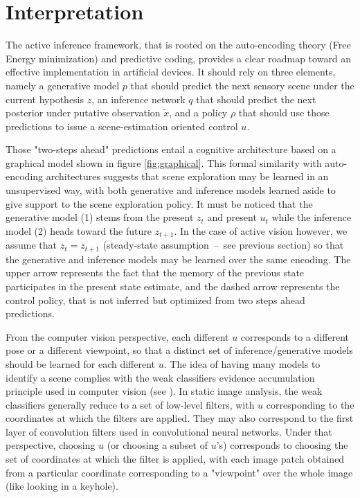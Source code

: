 \documentclass{article} %
\begin{document}
\section{Interpretation}

The active inference framework, that is rooted on the auto-encoding theory (Free Energy minimization) and predictive coding, provides a clear roadmap toward an effective implementation in artificial devices. It should rely on three elements, namely a generative model $p$ that should predict the next sensory scene under the current hypothesis $z$, an inference network $q$ that should predict the next posterior under putative observation $\tilde{x}$, and a policy $\rho$ that should use those predictions to issue a scene-estimation oriented control $u$.  



Those "two-steps ahead" predictions entail a cognitive architecture based on a graphical model shown in figure \ref{fig:graphical}.
This formal similarity with auto-encoding architectures suggests that scene exploration may be learned in an unsupervised way, with both generative and inference models learned aside to give support to the scene exploration policy. It must be noticed that the generative model (1) stems from the present $z_t$ and present $u_t$ while the inference model (2) heads toward the future $z_{t+1}$.  In the case of active vision however, we assume that $z_t = z_{t+1}$ (steady-state assumption~--~see previous section) so that the generative and inference models may be learned over the same encoding. The upper arrow represents the fact that the memory of the previous state participates in the present state estimate, and the dashed arrow represents the control policy, that is not inferred but optimized from two steps ahead predictions.

From the computer vision perspective, each different $u$ corresponds to a different pose or a different viewpoint, so that a distinct set of inference/generative models should be learned for each different $u$. The idea of having many models to identify a scene complies with the weak classifiers evidence accumulation principle used in computer vision (see \cite{viola2003fast}). In static image analysis, the weak classifiers generally reduce to a set of low-level filters, with $u$ corresponding to the coordinates at which the filters are applied. They may also correspond to the first layer of convolution filters used in convolutional neural networks. Under that perspective, choosing $u$ (or choosing a subset of $u$'s) corresponds to choosing the set of coordinates at which the filter is applied, with each image patch obtained from a particular coordinate corresponding to a "viewpoint" over the whole image (like looking in a keyhole). 
\end{document}
